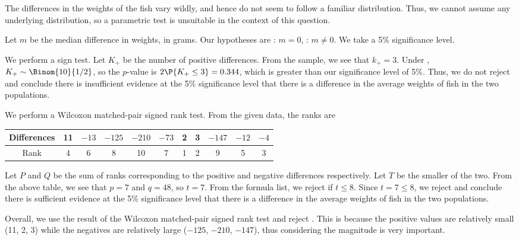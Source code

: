 \begin{solution}
    The differences in the weights of the fish vary wildly, and hence do not seem to follow a familiar distribution. Thus, we cannot assume any underlying distribution, so a parametric test is unsuitable in the context of this question.

    Let $m$ be the median difference in weights, in grams. Our hypotheses are \nullhyp: $m = 0$, \althyp: $m \neq 0$. We take a 5\% significance level.
    \begin{ppart}
        We perform a sign test. Let $K_+$ be the number of positive differences. From the sample, we see that $k_+ = 3$. Under \nullhyp, $K_+ \sim \Binom{10}{1/2}$, so the $p$-value is $2\P{K_+ \leq 3} = 0.344$, which is greater than our significance level of 5\%. Thus, we do not reject \nullhyp{} and conclude there is insufficient evidence at the 5\% significance level that there is a difference in the average weights of fish in the two populations.
    \end{ppart}
    \begin{ppart}
        We perform a Wilcoxon matched-pair signed rank test. From the given data, the ranks are
        \begin{table}[H]
            \centering
            \begin{tabular}{|c|c|c|c|c|c|c|c|c|c|c|}
            \hline
            Differences & 11 & $-13$ & $-125$ & $-210$ & $-73$ & 2 & 3 & $-147$ & $-12$ & $-4$ \\ \hline
            Rank & 4 & 6 & 8 & 10 & 7 & 1 & 2 & 9 & 5 & 3 \\ \hline
            \end{tabular}
        \end{table}
        Let $P$ and $Q$ be the sum of ranks corresponding to the positive and negative differences respectively. Let $T$ be the smaller of the two. From the above table, we see that $p = 7$ and $q = 48$, so $t = 7$. From the formula list, we reject \nullhyp{} if $t \leq 8$. Since $t = 7 \leq 8$, we reject \nullhyp{} and conclude there is sufficient evidence at the 5\% significance level that there is a difference in the average weights of fish in the two populations.
    \end{ppart}

    Overall, we use the result of the Wilcoxon matched-pair signed rank test and reject \nullhyp. This is because the positive values are relatively small (11, 2, 3) while the negatives are relatively large ($-125$, $-210$, $-147$), thus considering the magnitude is very important.
\end{solution}

